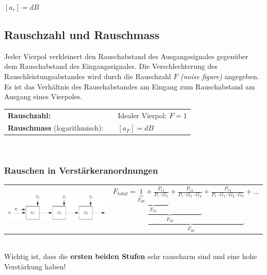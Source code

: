 		$[a_r] = dB$
	
	
	\subsection{Rauschzahl und Rauschmass }
	
		Jeder Vierpol verkleinert den Rauschabstand des Ausgangssignales gegenüber dem Rauschabstand des Eingangssignales.
		Die Verschlechterung des Rauschleistungsabstandes wird durch die Rauschzahl $F$ \textit{(noise figure)} angegeben.
		Es ist das Verhältnis des Rauschabstandes am Eingang zum Rauschabstand am Ausgang eines Vierpoles.\\
		
		\begin{tabular}{lll}
			\textbf{Rauschzahl:}
		&	\fbox{$F 	= \dfrac{\text{SNR}_{Eingang}}{\text{SNR}_{Ausgang}}
						= \dfrac{\frac{P_{sEingang}}{P_{rEingang}}}{\frac{P_{sAusgang}}{P_{rAusgang}}} 
						= \frac{P_{sEingang}}{P_{rEingang}} \cdot \frac{P_{rAusgang}}{P_{sAusgang}}$}
		&	Idealer Vierpol: $F = 1$
		\\
			\textbf{Rauschmass} (logarithmisch):
		&	\formel{$a_F = 10 \cdot log_{10} (F) = a_{rEingang} - a_{rAusgang}$}
		&	$[a_F] = dB$
		\end{tabular}\\
		
		\subsubsection{Rauschen in Verstärkeranordnungen }
		
			\begin{tabular}{ll}
				\parbox{8cm}{
					\includegraphics[width=8cm]{./bilder/rauschzahl.png}
				}
			&
				$F_{total} = \underbrace{\underbrace{\underbrace{\underbrace{
								1}_{F_{00}}
								+ \frac{P_{r1}}{P_r \cdot G_1}}_{F_{01}}
								+ \frac{P_{r2}}{P_r \cdot G_1 \cdot G_2}}_{F_{02}}
								+ \frac{P_{r3}}{P_r \cdot G_1 \cdot G_2 \cdot G_3} }_{F_{03}}
								+ \ldots $
			\end{tabular} \\
			Wichtig ist, dass die \textbf{ersten beiden Stufen} sehr rauscharm sind und eine hohe Verstärkung haben!
	
